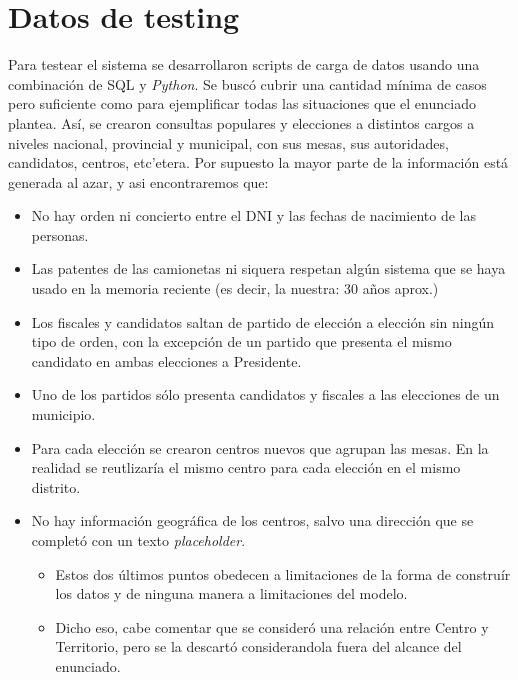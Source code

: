 \documentclass{article}
\begin{document}


\section{Datos de testing}
Para testear el sistema se desarrollaron scripts de carga de datos usando una combinación de SQL y
\emph{Python}.  Se buscó cubrir una cantidad mínima de casos pero suficiente como para ejemplificar
todas las situaciones que el enunciado plantea.  Así, se crearon consultas populares y elecciones
a distintos cargos a niveles nacional, provincial y municipal, con sus mesas, sus autoridades,
candidatos, centros, etc'etera.  Por supuesto la mayor parte de la información está generada al
azar, y asi encontraremos que:

\begin{itemize}
	\item No hay orden ni concierto entre el DNI y las fechas de nacimiento de las personas.
	\item Las patentes de las camionetas ni siquera respetan algún sistema que se haya usado en la
		memoria reciente (es decir, la nuestra: 30 años aprox.)
	\item Los fiscales y candidatos saltan de partido de elección a elección sin ningún tipo de
		orden, con la excepción de un partido que presenta el mismo candidato en ambas elecciones a
		Presidente.
	\item Uno de los partidos sólo presenta candidatos y fiscales a las elecciones de un municipio.
	\item Para cada elección se crearon centros nuevos que agrupan las mesas.  En la realidad se
		reutlizaría el mismo centro para cada elección en el mismo distrito.
	\item No hay información geográfica de los centros, salvo una dirección que se completó con un
		texto \emph{placeholder}.
		\begin{itemize}
			\item Estos dos últimos puntos obedecen a limitaciones de la forma de construír los
				datos y de ninguna manera a limitaciones del modelo.
			\item  Dicho eso, cabe comentar que se consideró una relación entre Centro y Territorio,
				pero se la descartó considerandola fuera del alcance del enunciado.
		\end{itemize}
\end{itemize}
\end{document}
